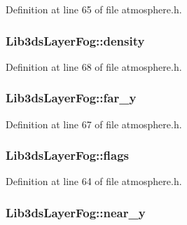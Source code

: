 Definition at line 65 of file atmosphere.\-h.

\hypertarget{struct_lib3ds_layer_fog_a411a3d81cb2d119cf85e99b448f9be6c}{
\subsubsection[{density}]{ Lib3ds\-Layer\-Fog\-::density}}\label{struct_lib3ds_layer_fog_a411a3d81cb2d119cf85e99b448f9be6c}


Definition at line 68 of file atmosphere.\-h.

\hypertarget{struct_lib3ds_layer_fog_a02f64331b7ece99701bae6ef7c2b12e0}{
\subsubsection[{far\-\_\-y}]{ Lib3ds\-Layer\-Fog\-::far\-\_\-y}}\label{struct_lib3ds_layer_fog_a02f64331b7ece99701bae6ef7c2b12e0}


Definition at line 67 of file atmosphere.\-h.

\hypertarget{struct_lib3ds_layer_fog_adfc8430e5a130d3ac33fc463d671f0be}{
\subsubsection[{flags}]{ Lib3ds\-Layer\-Fog\-::flags}}\label{struct_lib3ds_layer_fog_adfc8430e5a130d3ac33fc463d671f0be}


Definition at line 64 of file atmosphere.\-h.

\hypertarget{struct_lib3ds_layer_fog_a9918459fd4d38eddcf1ac6931b7e5100}{
\subsubsection[{near\-\_\-y}]{ Lib3ds\-Layer\-Fog\-::near\-\_\-y}}\label{struct_lib3ds_layer_fog_a9918459fd4d38eddcf1ac6931b7e5100}



